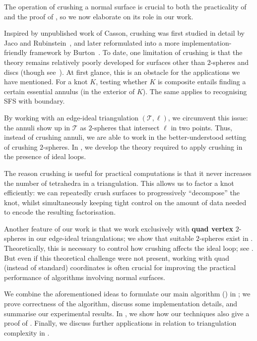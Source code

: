 \documentclass[10pt,a4paper]{amsart}
\newcommand{\tri}{\mathcal{T}}
\begin{document}
The operation of crushing a normal surface is crucial to both the practicality of  and the proof of , so we now elaborate on its role in our work.

Inspired by unpublished work of Casson, crushing was first studied in detail by Jaco and Rubinstein~\cite{jaco2003efficient},
and later reformulated into a more implementation-friendly framework by Burton~\cite{burton2014crushing}.
To date, one limitation of crushing is that the theory remains relatively poorly developed for surfaces other than $2$-spheres and discs (though see~\cite{BHHP2024arXiv,Ichihara2023Crush}).
At first glance, this is an obstacle for the applications we have mentioned.
For a knot $K$, testing whether $K$ is composite entails finding a certain essential
annulus (in the exterior of $K$).
The same applies to recognising SFS with boundary.

By working with an edge-ideal triangulation $(\tri,\ell)$, we circumvent this issue:
the annuli show up in $\tri$ as $2$-spheres that intersect $\ell$ in two points.
Thus, instead of crushing annuli, we are able to work in the better-understood setting of crushing $2$-spheres.
In , we develop the theory required to apply crushing in the presence of ideal loops.

The reason crushing is useful for practical computations is that it never increases the number of tetrahedra in a triangulation. This allows us to factor a knot efficiently: we can repeatedly crush surfaces to progressively ``decompose'' the knot, whilst simultaneously keeping tight control on the amount of data needed to encode the resulting factorisation.

Another feature of our work is that we work exclusively with \textbf{quad vertex} $2$-spheres in our edge-ideal triangulations;
we show that suitable $2$-spheres exist in .
Theoretically, this is necessary to control how crushing affects the ideal loop;
see .
But even if this theoretical challenge were not present, working with quad (instead of standard) coordinates is often crucial for improving the practical performance of algorithms involving normal surfaces.

We combine the aforementioned ideas to formulate our main algorithm () in ;
we prove correctness of the algorithm, discuss some implementation details, and summarise our experimental results.
In , we show how our techniques also give a proof of .
Finally, we discuss further applications in relation to triangulation complexity in .
\end{document}
